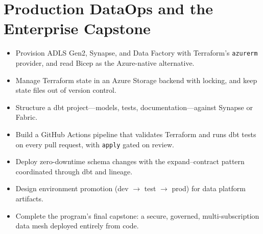\chapter{Production DataOps and the Enterprise Capstone}
%
\begin{objectives}
\begin{itemize}
    \item Provision ADLS Gen2, Synapse, and Data Factory with Terraform's \texttt{azurerm} provider, and read Bicep as the Azure-native alternative.
    \item Manage Terraform state in an Azure Storage backend with locking, and keep state files out of version control.
    \item Structure a dbt project---models, tests, documentation---against Synapse or Fabric.
    \item Build a GitHub Actions pipeline that validates Terraform and runs dbt tests on every pull request, with \texttt{apply} gated on review.
    \item Deploy zero-downtime schema changes with the expand--contract pattern coordinated through dbt and lineage.
    \item Design environment promotion (dev $\rightarrow$ test $\rightarrow$ prod) for data platform artifacts.
    \item Complete the program's final capstone: a secure, governed, multi-subscription data mesh deployed entirely from code.
\end{itemize}
\end{objectives}

